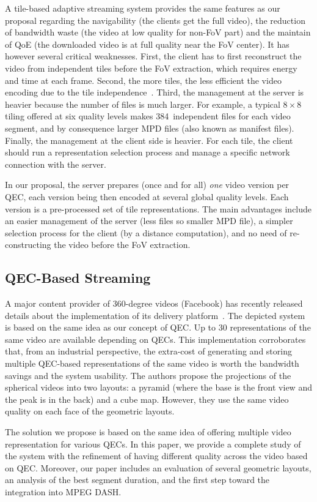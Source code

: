 A tile-based adaptive streaming
system provides the same features as our proposal regarding the navigability (the clients
get the full video), the reduction of bandwidth
waste (the video at low quality for non-\ac{FoV} part) and the maintain of \ac{QoE} (the downloaded video is at full quality near the
FoV center). It has however several critical weaknesses. First, the client has to first reconstruct
the video from independent tiles before the FoV extraction, which requires energy and
time at each frame. Second, the more tiles, the less efficient the video encoding due to the
tile independence~\cite{sanchez_compressed_2015}. Third, the management at the server is
heavier because the number of files
is much larger. For example, a typical $8\times8$ tiling offered at six quality levels makes
384~independent files for each video segment, and by consequence larger \ac{MPD} files (also known as
manifest files).
Finally, the management at the client side is heavier. For each tile, the client should run
a representation selection process
and manage a specific network connection with the server.

 In our proposal, the server prepares (once and for
all) \emph{one} video version per
\ac{QEC}, each version being then encoded at several global quality levels. Each version
is a pre-processed set of tile representations. The main advantages include an easier
management of the server
(less files so smaller \ac{MPD} file), a simpler selection process for the client (by
a distance computation), and no need of re-constructing the video before the \ac{FoV} extraction.

\subsection{QEC-Based Streaming}

A major content provider of 360-degree videos (Facebook) has recently
released details about the
implementation of its delivery platform~\cite{facebook}. The depicted system is based
on the same idea as our concept of \ac{QEC}. Up to 30 representations of the same video
are available depending on
\acp{QEC}. This implementation corroborates that, from an industrial perspective, the
extra-cost of
generating and storing multiple \ac{QEC}-based representations of the same video
is worth the bandwidth
savings and the system usability. The authors propose the projections of the spherical videos into two layouts: a pyramid (where the
base is the front
view and the peak is in the back) and a cube map. However, they use the same video quality
on each face of the geometric layouts.

The
solution we propose is based on the same idea of offering multiple video representation
for various \acp{QEC}.
In this paper, we provide a complete study of
the system with the refinement of having different quality across the video based on \ac{QEC}.
Moreover, our
paper includes an evaluation of several geometric layouts, an analysis of the best segment
duration, and the first step toward the integration into MPEG \ac{DASH}.
